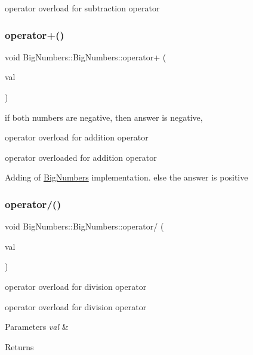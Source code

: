 operator overload for subtraction operator \mbox{\label{class_big_numbers_1_1_big_numbers_a45b596b4ef24a3c7fb71312d52eb187d}} 
\subsubsection{\texorpdfstring{operator+()}{operator+()}}
{\footnotesize\ttfamily void Big\+Numbers\+::\+Big\+Numbers\+::operator+ (\begin{DoxyParamCaption}\item[{\mbox{\hyperlink{class_big_numbers_1_1_big_numbers}{Big\+Numbers}} \&}]{val }\end{DoxyParamCaption})}



if both numbers are negative, then answer is negative, 

operator overload for addition operator

operator overloaded for addition operator

Adding of \mbox{\hyperlink{class_big_numbers_1_1_big_numbers}{Big\+Numbers}} implementation. else the answer is positive \mbox{\label{class_big_numbers_1_1_big_numbers_a2522e10c451d226125cf7c1287797810}} 
\subsubsection{\texorpdfstring{operator/()}{operator/()}}
{\footnotesize\ttfamily void Big\+Numbers\+::\+Big\+Numbers\+::operator/ (\begin{DoxyParamCaption}\item[{\mbox{\hyperlink{class_big_numbers_1_1_big_numbers}{Big\+Numbers}} \&}]{val }\end{DoxyParamCaption})}



operator overload for division operator 

operator overload for division operator


\begin{DoxyParams}{Parameters}
{\em val} & \\
\hline
\end{DoxyParams}
\begin{DoxyReturn}{Returns}

\end{DoxyReturn}
\mbox{\label{class_big_numbers_1_1_big_numbers_acc40f76e787dd3f8f1d276cfe6a5225f}} 
